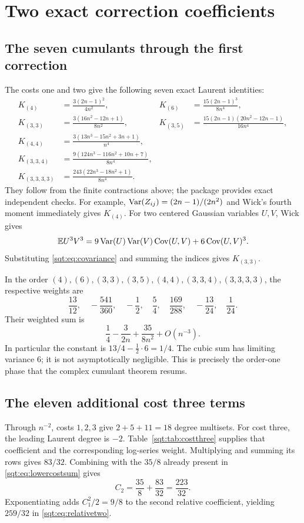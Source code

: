 \section{Two exact correction coefficients}\label{sqt:sec:coefficients}
\subsection{The seven cumulants through the first correction}
The costs one and two give the following seven exact Laurent identities:
\begin{align}
K_{(4)}&=\frac{3(2n-1)^2}{4n^2},&
K_{(6)}&=\frac{15(2n-1)^3}{8n^4},\label{sqt:eq:k46}\\
K_{(3,3)}&=\frac{3(16n^2-12n+1)}{8n^2},&
K_{(3,5)}&=\frac{15(2n-1)(20n^2-12n-1)}{16n^4},\label{sqt:eq:k335}\\
K_{(4,4)}&=\frac{3(13n^3-15n^2+3n+1)}{n^4},\label{sqt:eq:k44}\\
K_{(3,3,4)}&=\frac{9(124n^3-116n^2+10n+7)}{8n^4},\label{sqt:eq:k334}\\
K_{(3,3,3,3)}&=\frac{243(22n^3-18n^2+1)}{8n^4}.\label{sqt:eq:k3333}
\end{align}
They follow from the finite contractions above; the package provides exact independent checks. For example, $\operatorname{Var}(Z_{ij})=(2n-1)/(2n^2)$ and Wick's fourth moment immediately gives $K_{(4)}$. For two centered Gaussian variables $U,V$, Wick gives
\[
\mathbb E U^3V^3=9\operatorname{Var}(U)\operatorname{Var}(V)\operatorname{Cov}(U,V)+6\operatorname{Cov}(U,V)^3.
\]
Substituting \eqref{sqt:eq:covariance} and summing the indices gives $K_{(3,3)}$.

In the order $(4),(6),(3,3),(3,5),(4,4),(3,3,4),(3,3,3,3)$, the respective weights are
\[
\frac{13}{12},\quad-\frac{541}{360},\quad-\frac12,\quad
\frac54,\quad\frac{169}{288},\quad-\frac{13}{24},\quad\frac1{24}.
\]
Their weighted sum is
\begin{equation}\label{sqt:eq:lowercostsum}
\frac14-\frac{3}{2n}+\frac{35}{8n^2}+O(n^{-3}).
\end{equation}
In particular the constant is $13/4-\tfrac12\cdot6=1/4$. The cubic sum has limiting variance $6$; it is not asymptotically negligible. This is precisely the order-one phase that the complex cumulant theorem resums.

\subsection{The eleven additional cost three terms}
Through $n^{-2}$, costs $1,2,3$ give $2+5+11=18$ degree multisets. For cost three, the leading Laurent degree is $-2$. Table~\ref{sqt:tab:costthree} supplies that coefficient and the corresponding log-series weight. Multiplying and summing its rows gives $83/32$. Combining with the $35/8$ already present in \eqref{sqt:eq:lowercostsum} gives
\[
C_2=\frac{35}{8}+\frac{83}{32}=\frac{223}{32}.
\]
Exponentiating adds $C_1^2/2=9/8$ to the second relative coefficient, yielding $259/32$ in \eqref{sqt:eq:relativetwo}.

